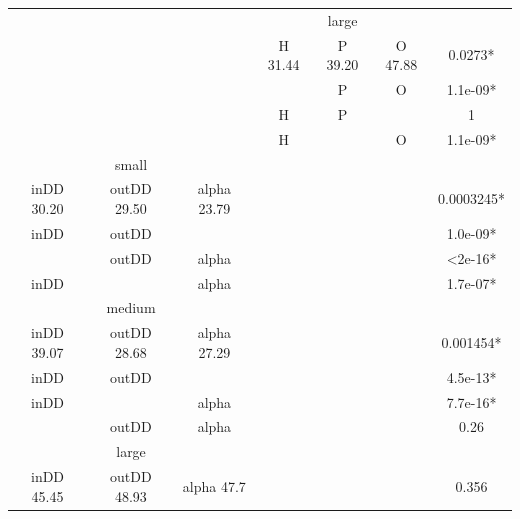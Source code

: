 \documentclass{l4proj}
\begin{document}
\begin{table}[H]
\begin{tabular}{|c|c|c|c|c|c|c|}
\multicolumn{3}{|c|}{\cellcolor{gray}}                    & \multicolumn{3}{c|}{large} & \cellcolor{gray}                                 \\ \cline{4-7} 
\multicolumn{3}{|c|}{\cellcolor{gray}}                    & H   31.44    & P   39.20   & O  47.88   & 0.0273*          \\ \cline{4-7} 
\multicolumn{3}{|c|}{\cellcolor{gray}}                    & \cellcolor{gray} & P     & O          & 1.1e-09*         \\ \cline{4-7} 
\multicolumn{3}{|c|}{\cellcolor{gray}}                    & H            & P & \cellcolor{gray}   & 1                \\ \cline{4-7} 
\multicolumn{3}{|c|}{\cellcolor{gray}}                    & H & \cellcolor{gray}     & O          & 1.1e-09*         \\ \hline
\multicolumn{3}{|c|}{small}               & \multicolumn{3}{c|}{\multirow{12}{*}{\cellcolor{gray}}} & \cellcolor{gray}                 \\ \cline{1-3} \cline{7-7} 
inDD 30.20   & outDD 29.50  & alpha 23.79 & \multicolumn{3}{c|}{\cellcolor{gray}}                   & 0.0003245*       \\ \cline{1-3} \cline{7-7} 
inDD         & outDD & \cellcolor{gray} & \multicolumn{3}{c|}{\cellcolor{gray}}                   & 1.0e-09*         \\ \cline{1-3} \cline{7-7} 
\cellcolor{gray} & outDD & alpha       & \multicolumn{3}{c|}{\cellcolor{gray}}                   & \textless 2e-16* \\ \cline{1-3} \cline{7-7} 
inDD    &\cellcolor{gray}     & alpha & \multicolumn{3}{c|}{\cellcolor{gray}}                   & 1.7e-07*         \\ \cline{1-3} \cline{7-7} 
\multicolumn{3}{|c|}{medium}              & \multicolumn{3}{c|}{\cellcolor{gray}}                   & \cellcolor{gray}                 \\ \cline{1-3} \cline{7-7} 
inDD 39.07   & outDD 28.68  & alpha 27.29 & \multicolumn{3}{c|}{\cellcolor{gray}}                   & 0.001454*        \\ \cline{1-3} \cline{7-7} 
inDD         & outDD & \cellcolor{gray} & \multicolumn{3}{c|}{\cellcolor{gray}}                   & 4.5e-13*         \\ \cline{1-3} \cline{7-7} 
inDD & \cellcolor{gray} & alpha       & \multicolumn{3}{c|}{\cellcolor{gray}}                   & 7.7e-16*         \\ \cline{1-3} \cline{7-7} 
\cellcolor{gray} & outDD & alpha       & \multicolumn{3}{c|}{\cellcolor{gray}}                   & 0.26             \\ \cline{1-3} \cline{7-7} 
\multicolumn{3}{|c|}{large}               & \multicolumn{3}{c|}{\cellcolor{gray}}                   &\cellcolor{gray}                  \\ \cline{1-3} \cline{7-7} 
inDD 45.45   & outDD 48.93  & alpha 47.7  & \multicolumn{3}{c|}{\cellcolor{gray}}                   & 0.356            \\ \hline
\end{tabular}
\end{table}
\end{document}
